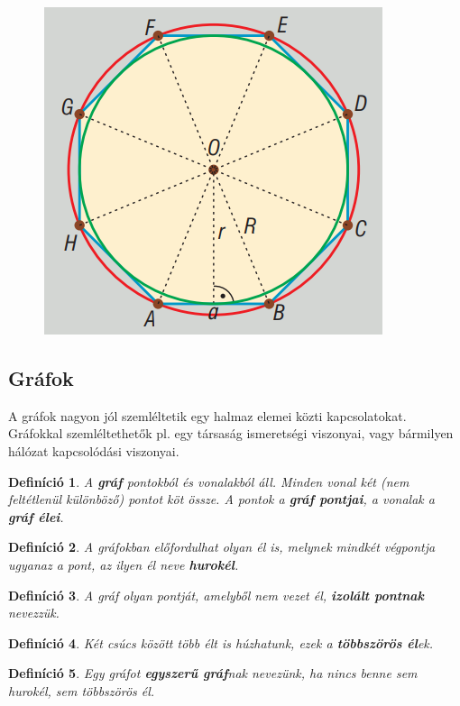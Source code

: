 \documentclass[12pt,a4paper]{article}
\newtheorem{definition}{Definíció} [section]
\begin{document}
\begin{figure}[h]
\centering
\includegraphics[scale=0.3]{geometry/sokszog}
\end{figure}

\subsection{Gráfok}
A gráfok nagyon jól szemléltetik egy halmaz elemei közti kapcsolatokat. Gráfokkal szemléltethetők pl. egy társaság ismeretségi viszonyai, vagy bármilyen hálózat kapcsolódási viszonyai.

\begin{definition}
A \textbf{gráf} pontokból és vonalakból áll. Minden vonal két (nem feltétlenül különböző) pontot köt össze. A pontok a \textbf{gráf pontjai}, a vonalak a \textbf{gráf élei}.
\end{definition}

\begin{definition}
A gráfokban előfordulhat olyan él is, melynek mindkét végpontja ugyanaz a pont, az ilyen él neve \textbf{hurokél}.
\end{definition}

\begin{definition}
A gráf olyan pontját, amelyből nem vezet él, \textbf{izolált pontnak} nevezzük.
\end{definition}

\begin{definition}
Két csúcs között több élt is húzhatunk, ezek a \textbf{többszörös él}ek.
\end{definition}

\begin{definition}
Egy gráfot \textbf{egyszerű gráf}nak nevezünk, ha nincs benne sem hurokél, sem többszörös él.
\end{definition}
\end{document}
